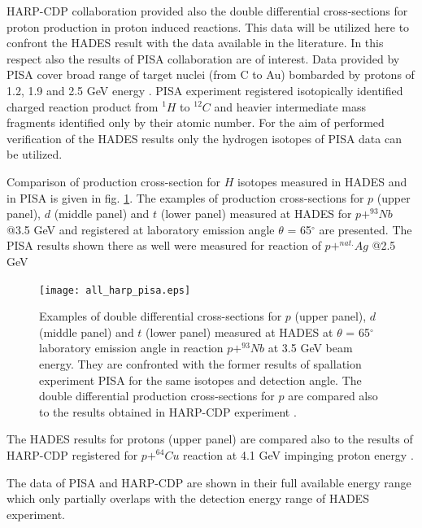 HARP-CDP collaboration provided also the double differential cross-sections for proton production in proton induced reactions. This data will be utilized here to confront the HADES result with the data available in the literature. In this respect also the
results of PISA collaboration 
\cite{fidelus2017non}  
are of interest. Data provided by PISA cover broad range of target nuclei (from C to Au) bombarded by protons of 1.2, 1.9 and 2.5 GeV energy \cite{bubak2007non,budzanowski2008competition,budzanowski2009variation,budzanowski2010comparison,fidelus2014sequential,fidelus2017non}. PISA experiment registered isotopically identified charged reaction product from $^{1}H$ to $^{12}C$ and heavier intermediate mass fragments identified only by their atomic number. 
For the aim of performed verification of the HADES results only the 
hydrogen isotopes of PISA data can be utilized.

Comparison of production cross-section for $H$ isotopes measured in HADES and in PISA is given  
in fig. \ref{Comp_PISA_HARP_pdt}.  
The examples of production cross-sections for 
$p$ (upper panel), $d$ (middle panel) and $t$ (lower panel) measured at HADES 
for $p+^{93}Nb$ @3.5 GeV and registered at laboratory emission angle $\theta$ = 65$^{\circ}$ are presented. The PISA results shown there as well were measured for reaction of $p+^{nat.}Ag$ @2.5 GeV  \cite{fidelus2017non} 

\begin{figure}[!ht]
\centering
	\texttt{[image: all\_harp\_pisa.eps]}
	\caption{\label{Comp_PISA_HARP_pdt} 
		Examples of double differential cross-sections for $p$ (upper panel), $d$ (middle panel) and $t$ 
		(lower panel) measured at HADES 
		at $\theta$ = 65$^{\circ}$ laboratory emission angle in reaction $p+^{93}Nb$ at 
		3.5 GeV beam energy.  They are confronted with the former results of spallation  
		experiment PISA \cite{fidelus2017non} for the same isotopes and detection angle. The double differential production 
		cross-sections for $p$ are compared also to the results obtained in HARP-CDP experiment \cite{HARP_CDP_Cu_2009}. 
	}
\end{figure}

The HADES results for protons (upper panel) are compared also to 
the results of HARP-CDP 
registered for $p+^{64}Cu$ reaction at 4.1 GeV impinging proton energy \cite{HARP_CDP_Cu_2009}. 

The data of PISA and HARP-CDP are shown in their full available energy range which only partially overlaps with the detection energy range of HADES experiment.

